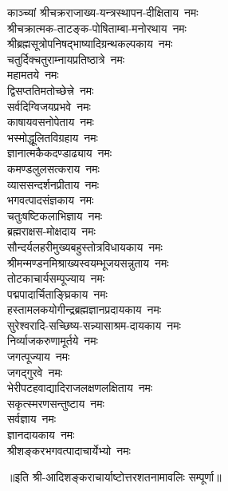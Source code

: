 \begin{multicols}{2}
\begin{flushleft}
काञ्च्यां श्रीचक्रराजाख्य-यन्त्रस्थापन-दीक्षिताय~नमः\\
श्रीचक्रात्मक-ताटङ्क-पोषिताम्बा-मनोरथाय~नमः\\
श्रीब्रह्मसूत्रोपनिषद्\-भाष्यादि\-ग्रन्थ\-कल्पकाय~नमः\\
चतुर्दिक्चतुराम्नाय\-प्रतिष्ठात्रे~नमः\\
महामतये~नमः\\
द्विसप्ततिमतोच्छेत्त्रे~नमः\\
सर्वदिग्विजयप्रभवे~नमः\\
काषायवसनोपेताय~नमः\\
भस्मोद्धूलितविग्रहाय~नमः\\
ज्ञानात्मकैकदण्डाढ्याय~नमः\hfill{}\\
        
कमण्डलुलसत्कराय~नमः\\
व्याससन्दर्शनप्रीताय~नमः\\
भगवत्पादसंज्ञकाय~नमः\\
चतुःषष्टिकलाभिज्ञाय~नमः\\
ब्रह्मराक्षस-मोक्षदाय~नमः\\
सौन्दर्यलहरी\-मुख्य\-बहु\-स्तोत्र\-विधाय\-काय~नमः\\
श्रीमन्मण्डन\-मिश्राख्य\-स्वयम्भू\-जय\-सन्नुताय~नमः\\
तोटकाचार्यसम्पूज्याय~नमः\\
पद्मपादार्चिताङ्घ्रिकाय~नमः\\
हस्तामलक\-योगीन्द्र\-ब्रह्म\-ज्ञान\-प्रदायकाय~नमः\hfill{}\\

सुरेश्वरादि-सच्छिष्य-सन्न्यासाश्रम-दायकाय~नमः\\
निर्व्याजकरुणामूर्तये~नमः\\
जगत्पूज्याय~नमः\\
जगद्गुरवे~नमः\\
भेरी\-पटह\-वाद्यादि\-राजलक्षण\-लक्षिताय~नमः\\
सकृत्स्मरणसन्तुष्टाय~नमः\\
सर्वज्ञाय~नमः\\
ज्ञानदायकाय~नमः\hfill{}\\
श्रीशङ्करभगवत्\-पादाचार्येभ्यो~नमः\\
                                                                                
    \end{flushleft}
\end{multicols}
॥इति श्री-आदिशङ्कराचार्याष्टोत्तरशतनामावलिः  सम्पूर्णा॥
